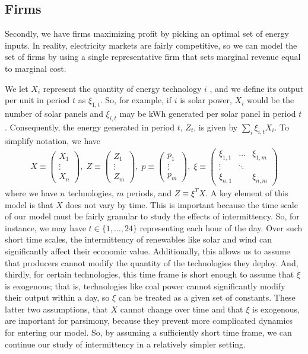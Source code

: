 \documentclass[11pt,a4paper,leqno]{extarticle}
\begin{document}
	\subsection{Firms}
	
	Secondly, we have firms maximizing profit by picking an optimal set of energy inputs. In reality, electricity markets are fairly competitive, so we can model the set of firms by using a single representative firm that sets marginal revenue equal to marginal cost. 
	
	We let $X_i$  represent the quantity of energy technology $i$ , and we define its output per unit in period $t$ as $\xi_{1,t}$. So, for example, if $i$ is solar power, $X_i$ would be the number of solar panels and $\xi_{i,t}$ may be kWh generated per solar panel in period $t$. Consequently, the energy generated in period $t$, $Z_t$, is given by $\sum_i \xi_{i,t} X_i$. To simplify notation, we have
	\begin{align*}
	X \equiv \begin{pmatrix}
	X_1\\
	\vdots\\
	X_n
	\end{pmatrix} ,\;
	Z \equiv \begin{pmatrix}
	Z_1\\
	\vdots\\
	Z_m
	\end{pmatrix} ,\;
	p \equiv \begin{pmatrix}
	p_1\\
	\vdots\\
	p_m
	\end{pmatrix} ,\;
	\xi \equiv \begin{pmatrix}
	\xi_{1,1} & \dots & \xi_{1,m}\\
	\vdots & \ddots & \\
	\xi_{n,1} &  & \xi_{n,m}
	\end{pmatrix} 
	\end{align*}
	where we have $n$ technologies, $m$ periods, and $Z \equiv \xi^T X$. A key element of this model is that $X$ does not vary by time. This is important because the time scale of our model must be fairly granular to study the effects of intermittency. So, for instance, we may have $t \in \{ 1, \dots, 24\}$ representing each hour of the day. Over such short time scales, the intermittency of renewables like solar and wind can significantly affect their economic value. Additionally, this allows us to assume that producers cannot modify the quantity of the technologies they deploy. And, thirdly, for certain technologies, this time frame is short enough to assume that $\xi$ is exogenous; that is, technologies like coal power cannot significantly modify their output within a day, so $\xi$ can be treated as a given set of constants. These latter two assumptions, that $X$ cannot change over time and that $\xi$ is exogenous, are important for parsimony, because they prevent more complicated dynamics for entering our model. So, by assuming a sufficiently short time frame, we can continue our study of intermittency in a relatively simpler setting. 
	
\end{document}
